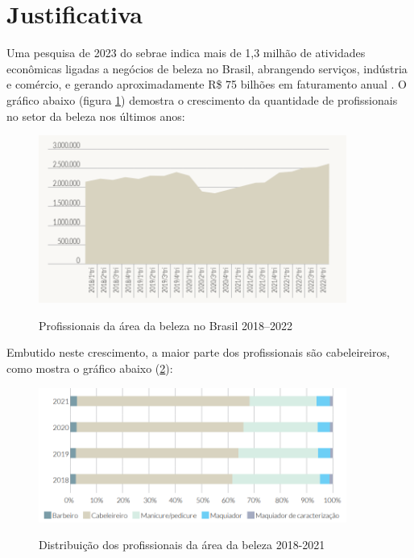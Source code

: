 \section{Justificativa}

Uma pesquisa de 2023 do \gls{sebrae} indica mais de 1,3 milhão de atividades econômicas ligadas a negócios de beleza no Brasil, abrangendo serviços, indústria e comércio, e gerando aproximadamente R\$ 75 bilhões em faturamento anual \cite{sebrae2023forca}. O gráfico abaixo (figura \ref{fig:profissionais_brasil}) demostra o crescimento da quantidade de profissionais no setor da beleza nos últimos anos:

 \begin{figure}[htb]
 	\centering
 	\caption{Profissionais da área da beleza no Brasil 2018–2022}
 	\includegraphics[width=0.9\textwidth]{cap01-Introducao/Images/1.3_grafico_profissionais_brasil}
 	\label{fig:profissionais_brasil}
 \end{figure}
 
 \FloatBarrier
 
Embutido neste crescimento, a maior parte dos profissionais são cabeleireiros, como mostra o gráfico abaixo (\ref{fig:Distribuição_profissionais}):

\begin{figure}[htb]
	\centering
	\caption{Distribuição dos profissionais da área da beleza 2018-2021}
	\includegraphics[width=0.9\textwidth]{cap01-Introducao/Images/1.3_grafico_maioria_cabeleireiros}
	\label{fig:Distribuição_profissionais}
\end{figure}

